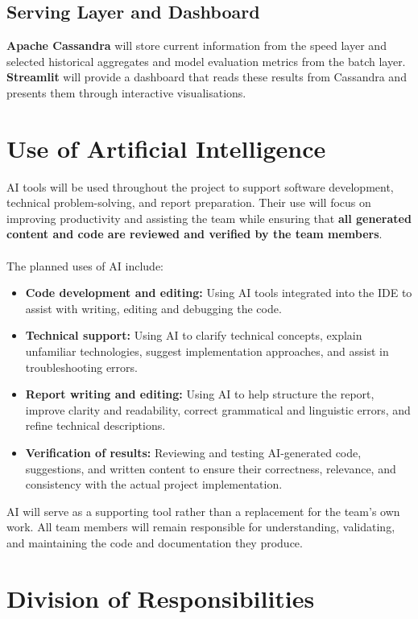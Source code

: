 \documentclass[11pt]{article}
\begin{document}
\subsection{Serving Layer and Dashboard}

\textbf{Apache Cassandra} will store current information from the speed layer and selected historical aggregates and model evaluation metrics from the batch layer. \textbf{Streamlit} will provide a dashboard that reads these results from Cassandra and presents them through interactive visualisations.

\section{Use of Artificial Intelligence}

AI tools will be used throughout the project to support software development, technical problem-solving, and report preparation. Their use will focus on improving productivity and assisting the team while ensuring that \textbf{all generated content and code are reviewed and verified by the team members}. \\ \\
The planned uses of AI include:
\begin{itemize}
    \item \textbf{Code development and editing:} Using AI tools integrated into the IDE to assist with writing, editing and debugging the code.
    \item \textbf{Technical support:} Using AI to clarify technical concepts, explain unfamiliar technologies, suggest implementation approaches, and assist in troubleshooting errors.
    \item \textbf{Report writing and editing:} Using AI to help structure the report, improve clarity and readability, correct grammatical and linguistic errors, and refine technical descriptions.
    \item \textbf{Verification of results:} Reviewing and testing AI-generated code, suggestions, and written content to ensure their correctness, relevance, and consistency with the actual project implementation.
\end{itemize}
AI will serve as a supporting tool rather than a replacement for the team's own work. All team members will remain responsible for understanding, validating, and maintaining the code and documentation they produce.

\section{Division of Responsibilities}
\end{document}
